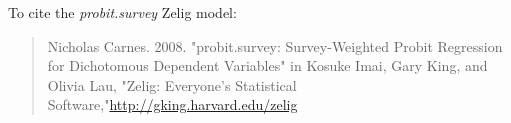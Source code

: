 To cite the \emph{ probit.survey } Zelig model:
 \begin{verse}
 Nicholas Carnes. 2008. "probit.survey: Survey-Weighted Probit Regression for Dichotomous Dependent Variables" in Kosuke Imai, Gary King, and Olivia Lau, "Zelig: Everyone's Statistical Software,"\url{http://gking.harvard.edu/zelig} 
\end{verse}